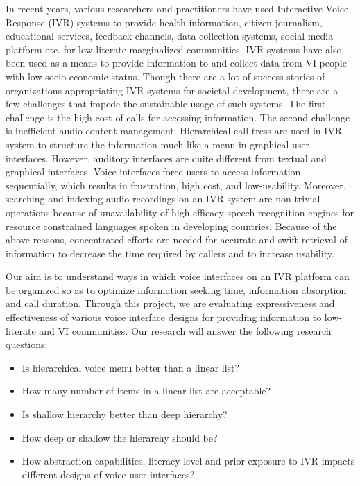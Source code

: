 \documentclass{sigchi}
\begin{document}
In recent years, various researchers and practitioners have used Interactive Voice Response (IVR) systems to provide health information, citizen journalism, educational services, feedback channels, data collection systems, social media platform etc. for low-literate marginalized communities. IVR systems have also been used as a means to provide information to and collect data from VI people with low socio-economic status. Though there are a lot of success stories of organizations appropriating IVR systems for societal development, there are a few challenges that impede the sustainable usage of such systems. The first challenge is the high cost of calls for accessing information. The second challenge is inefficient audio content management. Hierarchical call tress are used in IVR system to structure the information much like a menu in graphical user interfaces. However, auditory interfaces are quite different from textual and graphical interfaces. Voice interfaces force users to access information sequentially, which results in frustration, high cost, and low-usability. Moreover, searching and indexing audio recordings on an IVR system are non-trivial operations because of unavailability of high efficacy speech recognition engines for resource constrained languages spoken in developing countries. Because of the above reasons, concentrated efforts are needed for accurate and swift retrieval of information to decrease the time required by callers and to increase usability. 

Our aim is to understand ways in which voice interfaces on an IVR platform can be organized so as to optimize information seeking time, information absorption and call duration. Through this project, we are evaluating expressiveness and effectiveness of various voice interface designs for providing information to low-literate and VI communities. Our research will answer the following research questions:

\begin{itemize}
\item Is hierarchical voice menu better than a linear list?
\item How many number of items in a linear list are acceptable?
\item Is shallow hierarchy better than deep hierarchy?
\item How deep or shallow the hierarchy should be?
\item How abstraction capabilities, literacy level and prior exposure to IVR impacts different designs of voice user interfaces? 
\end{itemize}
\end{document}

